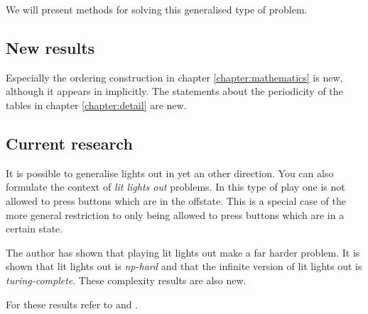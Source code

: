 We will present methods for solving this generalised type of problem.

\subsection{New results}

Especially the ordering construction in chapter \ref{chapter:mathematics} is
new, although it appears in \cite{martin01} implicitly. The statements about the
periodicity of the tables in chapter \ref{chapter:detail} are new.

\subsection{Current research}

It is possible to generalise lights out in yet an other direction. You can also
formulate the context of \emph{lit lights out} problems. In this type of play
one is not allowed to press buttons which are in the offstate. This is a
special case of the more general restriction to only being allowed to press
buttons which are in a certain state. 

The author has shown that playing lit lights out make a far harder problem. It
is shown that lit lights out is \emph{np-hard} and that the infinite version of
lit lights out is \emph{turing-complete}. These complexity results are also new.

For these results refer to \cite{wanrooy08a} and \cite{wanrooy08b}.
